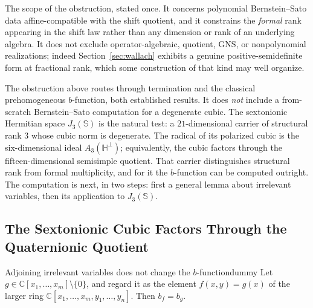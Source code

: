 \documentclass[11pt,letterpaper]{article}
\newcommand{\Cc}{\mathbb{C}}
\begin{document}
The scope of the obstruction, stated once. It concerns polynomial
Bernstein--Sato data affine-compatible with the shift quotient, and it constrains
the \emph{formal} rank appearing in the shift law rather than any dimension or
rank of an underlying algebra. It does not exclude operator-algebraic, quotient,
GNS, or nonpolynomial realizations; indeed Section~\ref{sec:wallach} exhibits a
genuine positive-semidefinite form at fractional rank, which some construction of that
kind may well organize.

\begin{remark}
\label{rem:bs-open}
The obstruction above routes through termination and the classical
prehomogeneous $b$-function, both established results. It does \emph{not}
include a from-scratch Bernstein--Sato computation for a degenerate cubic. The
sextonionic Hermitian space $J_3(\mathbb{S})$ is the natural test: a
$21$-dimensional carrier of structural rank $3$ whose cubic norm is degenerate.
The radical of its polarized cubic is the six-dimensional ideal
$A_3(\mathbb{H}^{\perp})$; equivalently, the cubic factors through the
fifteen-dimensional semisimple quotient. That carrier distinguishes structural
rank from formal multiplicity, and for it the $b$-function can be computed
outright. The computation is next, in two steps: first a general lemma about
irrelevant variables, then its application to $J_3(\mathbb{S})$.
\end{remark}

\subsection{The Sextonionic Cubic Factors Through the Quaternionic Quotient}

\begin{boxedlemma}{Adjoining irrelevant variables does not change the $b$-function}{dummy}
Let $g\in\Cc[x_1,\dots,x_m]\setminus\{0\}$, and regard it as the element
$f(x,y)=g(x)$ of the larger ring $\Cc[x_1,\dots,x_m,y_1,\dots,y_n]$. Then
$b_f=b_g$.
\end{boxedlemma}
\end{document}
